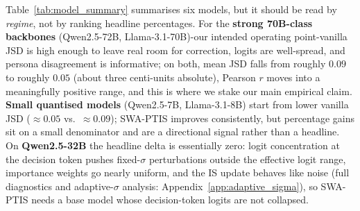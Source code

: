 \documentclass{article}
\begin{document}
Table~\ref{tab:model_summary} summarises six models, but it should be read by \emph{regime}, not by ranking headline percentages.
For the \textbf{strong 70B-class backbones} (Qwen2.5-72B, Llama-3.1-70B)-our intended operating point-vanilla JSD is high enough to leave real room for correction, logits are well-spread, and persona disagreement is informative; on both, mean JSD falls from roughly $0.09$ to roughly $0.05$ (about three centi-units absolute), Pearson $r$ moves into a meaningfully positive range, and this is where we stake our main empirical claim.
\textbf{Small quantised models} (Qwen2.5-7B, Llama-3.1-8B) start from lower vanilla JSD ($\approx 0.05$ vs.\ $\approx 0.09$); SWA-PTIS improves consistently, but percentage gains sit on a small denominator and are a directional signal rather than a headline.
On \textbf{Qwen2.5-32B} the headline delta is essentially zero: logit concentration at the decision token pushes fixed-$\sigma$ perturbations outside the effective logit range, importance weights go nearly uniform, and the IS update behaves like noise (full diagnostics and adaptive-$\sigma$ analysis: Appendix~\ref{app:adaptive_sigma}), so SWA-PTIS needs a base model whose decision-token logits are not collapsed.
\end{document}
